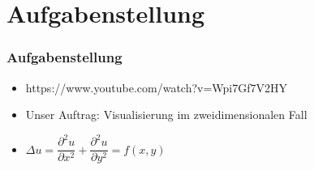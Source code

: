 \section{Aufgabenstellung}
	
\begin{frame}
\frametitle{Aufgabenstellung} 
	\begin{itemize}[<+->]
		\item https://www.youtube.com/watch?v=Wpi7Gf7V2HY
		\item Unser Auftrag: Visualisierung im zweidimensionalen Fall
		\item $\Delta u = \dfrac{\partial^2 u }{\partial x^2}+ \dfrac{\partial^2 u }{\partial y^2}=f(x,y)$
	\end{itemize}
\end{frame}		
